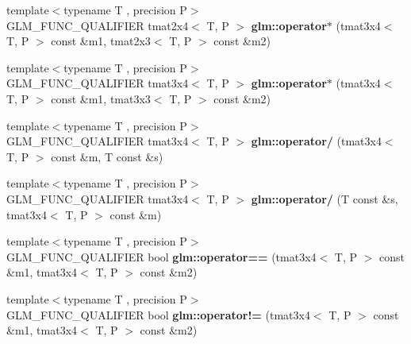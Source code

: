 \begin{DoxyCompactItemize}
\item 
\hypertarget{namespaceglm_a057892ce2a71e76f21025327e4347f10}{{\footnotesize template$<$typename T , precision P$>$ }\\G\-L\-M\-\_\-\-F\-U\-N\-C\-\_\-\-Q\-U\-A\-L\-I\-F\-I\-E\-R tmat2x4$<$ T, P $>$ {\bfseries glm\-::operator$\ast$} (tmat3x4$<$ T, P $>$ const \&m1, tmat2x3$<$ T, P $>$ const \&m2)}\label{namespaceglm_a057892ce2a71e76f21025327e4347f10}

\item 
\hypertarget{namespaceglm_a12c934eeec1b9ef7a759ab1941f55038}{{\footnotesize template$<$typename T , precision P$>$ }\\G\-L\-M\-\_\-\-F\-U\-N\-C\-\_\-\-Q\-U\-A\-L\-I\-F\-I\-E\-R tmat3x4$<$ T, P $>$ {\bfseries glm\-::operator$\ast$} (tmat3x4$<$ T, P $>$ const \&m1, tmat3x3$<$ T, P $>$ const \&m2)}\label{namespaceglm_a12c934eeec1b9ef7a759ab1941f55038}

\item 
\hypertarget{namespaceglm_a6e8dc5ca3b17dec86a047d382bc09321}{{\footnotesize template$<$typename T , precision P$>$ }\\G\-L\-M\-\_\-\-F\-U\-N\-C\-\_\-\-Q\-U\-A\-L\-I\-F\-I\-E\-R tmat3x4$<$ T, P $>$ {\bfseries glm\-::operator/} (tmat3x4$<$ T, P $>$ const \&m, T const \&s)}\label{namespaceglm_a6e8dc5ca3b17dec86a047d382bc09321}

\item 
\hypertarget{namespaceglm_a8224db0205ca28349b91c4ce36a29cb8}{{\footnotesize template$<$typename T , precision P$>$ }\\G\-L\-M\-\_\-\-F\-U\-N\-C\-\_\-\-Q\-U\-A\-L\-I\-F\-I\-E\-R tmat3x4$<$ T, P $>$ {\bfseries glm\-::operator/} (T const \&s, tmat3x4$<$ T, P $>$ const \&m)}\label{namespaceglm_a8224db0205ca28349b91c4ce36a29cb8}

\item 
\hypertarget{namespaceglm_a6ce503e89acc786363ee712f65b845d4}{{\footnotesize template$<$typename T , precision P$>$ }\\G\-L\-M\-\_\-\-F\-U\-N\-C\-\_\-\-Q\-U\-A\-L\-I\-F\-I\-E\-R bool {\bfseries glm\-::operator==} (tmat3x4$<$ T, P $>$ const \&m1, tmat3x4$<$ T, P $>$ const \&m2)}\label{namespaceglm_a6ce503e89acc786363ee712f65b845d4}

\item 
\hypertarget{namespaceglm_a39503545e324d1a4846ad10aee597a1e}{{\footnotesize template$<$typename T , precision P$>$ }\\G\-L\-M\-\_\-\-F\-U\-N\-C\-\_\-\-Q\-U\-A\-L\-I\-F\-I\-E\-R bool {\bfseries glm\-::operator!=} (tmat3x4$<$ T, P $>$ const \&m1, tmat3x4$<$ T, P $>$ const \&m2)}\label{namespaceglm_a39503545e324d1a4846ad10aee597a1e}

\end{DoxyCompactItemize}


